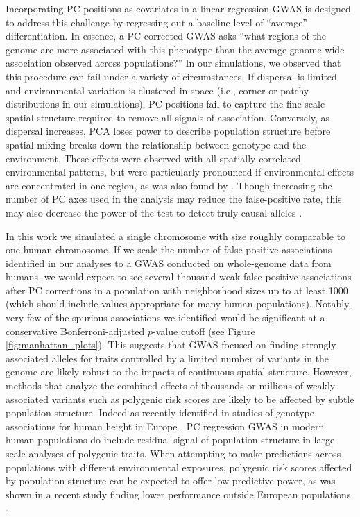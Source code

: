 \documentclass[10pt,twoside,lineno,hidelinks]{preprint}
\begin{document}
Incorporating PC positions as covariates in a linear-regression GWAS \citep{Price2006} is designed to address this challenge by regressing out a baseline level of ``average'' differentiation. 
In essence, a PC-corrected GWAS asks ``what regions of the genome are more associated with this phenotype than the average genome-wide association observed across populations?'' 
In our simulations, we observed that this procedure can fail under a variety of circumstances. 
If dispersal is limited and environmental variation is clustered in space (i.e., corner or patchy distributions in our simulations), PC positions fail to capture the fine-scale spatial structure required to remove all signals of association. Conversely, as dispersal increases, PCA loses power to describe population structure before spatial mixing breaks down the relationship between genotype and the environment. These effects were observed with all spatially correlated environmental patterns, but were particularly pronounced if environmental effects are concentrated in one region, as was also found by \citet{Mathieson2012}. Though increasing the number of PC axes used in the analysis may reduce the false-positive rate, this may also decrease the power of the test to detect truly causal alleles \citep{Lawson2019}. 

In this work we simulated a single chromosome with size roughly comparable to one human chromosome. If we scale the number of false-positive associations identified in our analyses to a GWAS conducted on whole-genome data from humans, we would expect to see several thousand weak false-positive associations after PC corrections in a population with neighborhood sizes up to at least 1000 (which should include values appropriate for many human populations). Notably, very few of the spurious associations we identified would be significant at a conservative Bonferroni-adjusted $p$-value cutoff (see Figure \ref{fig:manhattan_plots}). This suggests that GWAS focused on finding strongly associated alleles for traits controlled by a limited number of variants in the genome are likely robust to the impacts of continuous spatial structure. However, methods that analyze the combined effects of thousands or millions of weakly associated variants such as polygenic risk scores \citep{Khera2018} are likely to be affected by subtle population structure. Indeed as recently identified in studies of genotype associations for human height in Europe \citep{Berg2018,Sohail2018}, PC regression GWAS in modern human populations do include residual signal of population structure in large-scale analyses of polygenic traits. When attempting to make predictions across populations with different environmental exposures, polygenic risk scores affected by population structure can be expected to offer low predictive power, as was shown in a recent study finding lower performance outside European populations \citep{Martin2019}. 
\end{document}

